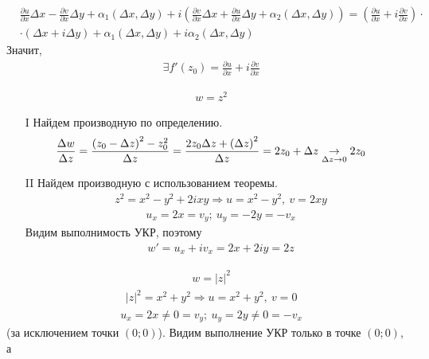 \begin{itemize}
\begin{align*}
      & \frac{\partial u}{\partial x} \Delta x - \frac{\partial v}{\partial x} \Delta y + \alpha_1(\Delta x, \Delta y) + i \left( \frac{\partial v}{\partial x} \Delta x + \frac{\partial u}{\partial x} \Delta y + \alpha_2(\Delta x, \Delta y)\right) = \left( \frac{\partial u}{\partial x} + i \frac{\partial v}{\partial x}\right)\cdot \\
      & \cdot \left( \Delta x + i \Delta y \right)+ \alpha_1(\Delta x, \Delta y) + i \alpha_2(\Delta x, \Delta y)
    \end{align*}
    Значит,
    \begin{align*}
      & \exists f'(z_0) = \frac{\partial u}{\partial x} + i \frac{\partial v}{\partial x}
    \end{align*}
\end{itemize}
\Example
\begin{align*}
  & w = z^2
\end{align*}
\begin{itemize}
    \item[I] Найдем производную по определению.
    \begin{align*}
      & \frac{\Delta w}{\Delta z} = \frac{\left( z_0-\Delta z \right)^2 - z_0^2}{\Delta z} = \frac{2z_0\Delta z + \left( \Delta z \right)^2}{\Delta z} = 2z_0 + \Delta z \underset{\Delta z \to 0}{\to} 2z_0
    \end{align*}
    \item[II] Найдем производную с использованием теоремы.
    \begin{align*}
      & z^2 = x^2-y^2+2ixy \Rightarrow u = x^2-y^2, \ v = 2xy
    \end{align*}
    \begin{align*}
      & u_x = 2x = v_y; \ u_y = -2y = - v_x
    \end{align*}
    Видим выполнимость УКР, поэтому
    \begin{align*}
      & w' = u_x+iv_x = 2x + 2iy = 2z
    \end{align*}
\end{itemize}
\Example
\begin{align*}
  & w = \left| z \right|^2
\end{align*}
\begin{align*}
  & \left| z \right|^2 = x^2+y^2 \Rightarrow u = x^2+y^2, \ v = 0
\end{align*}
\begin{align*}
  & u_x = 2x \neq 0 = v_y; \ u_y = 2y \neq 0 = - v_x
\end{align*}
(за исключением точки $(0;0)$). Видим выполнение УКР только в точке $(0;0)$, а
